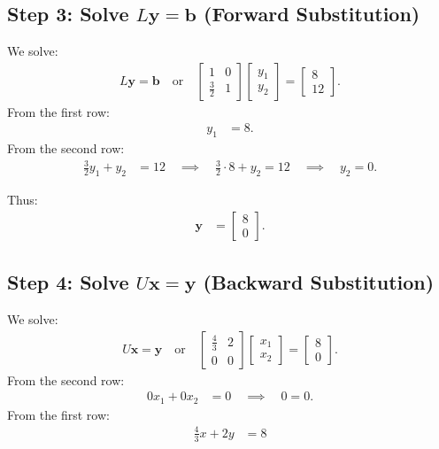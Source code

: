 \documentclass[journal]{IEEEtran}
\begin{document}
	\subsection*{Step 3: Solve $L\mathbf{y} = \mathbf{b}$ (Forward Substitution)}
	We solve:
	\begin{align}
		L\mathbf{y} = \mathbf{b} \quad \text{or} \quad \begin{bmatrix} 1 & 0 \\ \frac{3}{2} & 1 \end{bmatrix} \begin{bmatrix} y_1 \\ y_2 \end{bmatrix} = \begin{bmatrix} 8 \\ 12 \end{bmatrix}.
	\end{align}
	From the first row:
	\begin{align}
		y_1 &= 8.
	\end{align}
	From the second row:
	\begin{align}
		\frac{3}{2} y_1 + y_2 &= 12 \quad \implies \quad \frac{3}{2} \cdot 8 + y_2 = 12 \quad \implies \quad y_2 = 0.
	\end{align}
	
	Thus:
	\begin{align}
		\mathbf{y} &= \begin{bmatrix} 8 \\ 0 \end{bmatrix}.
	\end{align}
	
	\subsection*{Step 4: Solve $U\mathbf{x} = \mathbf{y}$ (Backward Substitution)}
	We solve:
	\begin{align}
		U\mathbf{x} = \mathbf{y} \quad \text{or} \quad \begin{bmatrix} \frac{4}{3} & 2 \\ 0 & 0 \end{bmatrix} \begin{bmatrix} x_1 \\ x_2 \end{bmatrix} = \begin{bmatrix} 8 \\ 0 \end{bmatrix}.
	\end{align}
	From the second row:
	\begin{align}
		0x_1+0x_2 &= 0 \quad \implies \quad 0=0.
	\end{align}
	From the first row:
	\begin{align}
		\frac{4}{3}x + 2y &= 8
	\end{align}
	
\end{document}
